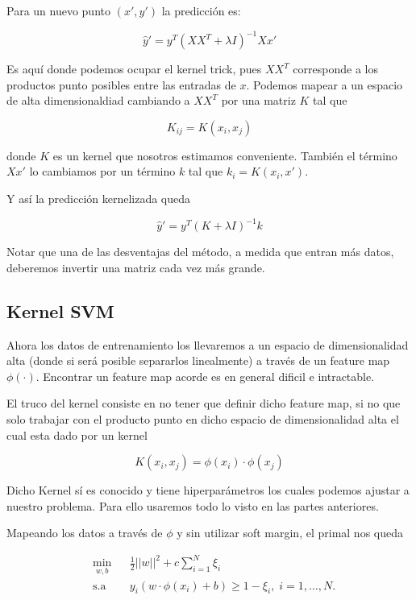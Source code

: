 Para un nuevo punto $(x', y')$ la predicción es: 

$$\hat{y}' = y^T (XX^T + \lambda I)^{-1} X x'$$


Es aquí donde podemos ocupar el kernel trick, pues $XX^T $ corresponde a los productos punto posibles entre las entradas de $x$. Podemos mapear a un espacio de alta dimensionaldiad cambiando a $XX^T$ por una matriz $K$ tal que

$$K_{ij} = K(x_i, x_j)$$

donde $K$ es un kernel que nosotros estimamos conveniente. También el término $X x' $ lo cambiamos por un término $k$ tal que $k_i = K(x_i , x')$.

Y así la predicción kernelizada queda

$$\hat{y}' = y^T (K + \lambda I)^{-1} k$$

Notar que una de las desventajas del método, a medida que entran más datos, deberemos invertir una matriz cada vez más grande. 

\subsection{Kernel SVM}



Ahora los datos de entrenamiento los llevaremos a un espacio de dimensionalidad alta (donde si será posible separarlos linealmente) a través de un feature map $\phi(\cdot)$. Encontrar un feature map acorde es en general dificil e intractable. 

El truco del kernel consiste en no tener que definir dicho feature map, si no que solo trabajar con el producto punto en dicho espacio de dimensionalidad alta el cual esta dado por un kernel 

$$K(x_i, x_j) = \phi(x_i) \cdot \phi(x_j)$$

Dicho Kernel sí es conocido y tiene hiperparámetros los cuales podemos ajustar a nuestro problema. Para ello usaremos todo lo visto en las partes anteriores.

Mapeando los datos a través de $\phi$ y sin utilizar soft margin, el primal nos queda

\begin{equation*}
\begin{aligned}
& \underset{w,b}{\text{min}}
& & \frac{1}{2}||w||^2 + c\sum\limits_{i=1}^{N} \xi_i\\
& \text{s.a}
& & y_i (w\cdot \phi(x_i) +b) \geq 1- \xi_i, \; i = 1, \ldots, N.
\end{aligned}
\end{equation*}

